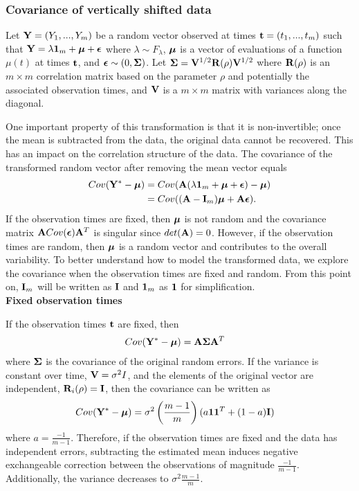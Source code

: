 \subsubsection{Covariance of vertically shifted data}
Let $\mathbf Y=(Y_{1},...,Y_{m})$ be a random vector observed at times $\mathbf t=(t_{1},...,t_{m})$ such that
$\mathbf Y = \lambda\mathbf 1_{m} + \boldsymbol\mu + \boldsymbol\epsilon$
where $\lambda\sim F_{\lambda}$, $\boldsymbol\mu$ is a vector of evaluations of a function $\mu(t)$ at times $\mathbf t$, and $\boldsymbol\epsilon\sim(0,\boldsymbol\Sigma)$. Let $\mathbf\Sigma =\mathbf V^{1/2}\mathbf R(\rho)\mathbf V^{1/2}$ where $\mathbf R(\rho)$ is an $m\times m$ correlation matrix based on the parameter $\rho$ and potentially the associated observation times, and $\mathbf V$ is a $m\times m$ matrix with variances along the diagonal. 

 One important property of this transformation is that it is non-invertible; once the mean is subtracted from the data, the original data cannot be recovered. This has an impact on the correlation structure of the data. The covariance of the transformed random vector after removing the mean vector equals
\begin{align*}
Cov(\mathbf Y^{*} - \boldsymbol\mu) &= Cov(\mathbf A(\lambda\mathbf 1_{m} + \boldsymbol\mu + \boldsymbol\epsilon) - \boldsymbol\mu)\\
&= Cov((\mathbf A-\mathbf I_{m})\boldsymbol\mu + \mathbf A \boldsymbol\epsilon).
\end{align*}
If the observation times are fixed, then $\boldsymbol \mu$ is not random and the covariance matrix $\mathbf A Cov(\boldsymbol\epsilon)\mathbf A^{T}$ is singular since $det(\mathbf A) =0$. However, if the observation times are random, then $\boldsymbol \mu$ is a random vector and contributes to the overall variability. To better understand how to model the transformed data, we explore the covariance when the observation times are fixed and random. From this point on, $\mathbf I_{m}$ will be written as $\mathbf I$ and $\mathbf 1_{m}$ as $\mathbf 1$ for simplification.\\

\noindent \textbf{Fixed observation times}

If the observation times $\mathbf t$ are fixed, then
\begin{align*}
Cov(\mathbf Y^{*} - \boldsymbol\mu) &= \mathbf A\boldsymbol\Sigma \mathbf A^{T}
\end{align*}
where $\boldsymbol\Sigma$ is the covariance of the original random errors. If the variance is constant over time, $\mathbf V=\sigma^{2}I$, and the elements of the original vector are independent, $\mathbf R_{i}(\rho)=\mathbf I$, then the covariance can be written as
\begin{align*} 
Cov(\mathbf Y^{*}- \boldsymbol\mu) &=\sigma^{2}\left(\frac{m-1}{m}\right)(a\mathbf 1\mathbf 1^{T}+ (1-a)\mathbf I)
\end{align*}
 where $a=\frac{-1}{m-1}$. Therefore, if the observation times are fixed and the data has independent errors, subtracting the estimated mean induces negative exchangeable correction between the observations of magnitude $\frac{-1}{m-1}$. Additionally, the variance decreases to $\sigma^{2}\frac{m-1}{m}$.
 
